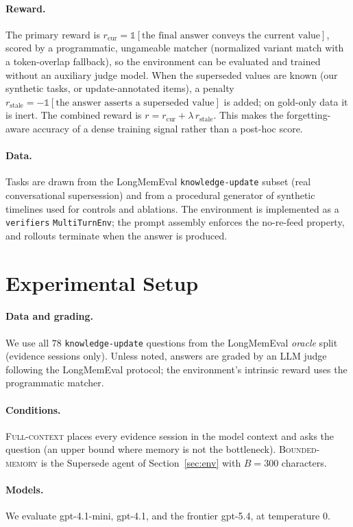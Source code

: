 \documentclass[]{ceurart}
\begin{document}
\paragraph{Reward.} The primary reward is $r_{\text{cur}}=\mathbb{1}[\text{the
final answer conveys the current value}]$, scored by a programmatic,
ungameable matcher (normalized variant match with a token-overlap fallback),
so the environment can be evaluated and trained without an auxiliary judge
model. When the superseded values are known (our synthetic tasks, or
update-annotated items), a penalty
$r_{\text{stale}}=-\mathbb{1}[\text{the answer asserts a superseded value}]$
is added; on gold-only data it is inert. The combined reward is
$r = r_{\text{cur}} + \lambda\, r_{\text{stale}}$. This makes the
forgetting-aware accuracy of \cite{fama2026} a dense training signal rather
than a post-hoc score.

\paragraph{Data.} Tasks are drawn from the LongMemEval
\texttt{knowledge-update} subset (real conversational supersession) and from a
procedural generator of synthetic timelines used for controls and ablations.
The environment is implemented as a \texttt{verifiers} \texttt{MultiTurnEnv};
the prompt assembly enforces the no-re-feed property, and rollouts terminate
when the answer is produced.

\section{Experimental Setup}

\paragraph{Data and grading.} We use all $78$ \texttt{knowledge-update}
questions from the LongMemEval \emph{oracle} split (evidence sessions only).
Unless noted, answers are graded by an LLM judge following the LongMemEval
protocol; the environment's intrinsic reward uses the programmatic matcher.
\paragraph{Conditions.} \textsc{Full-context} places every evidence session in
the model context and asks the question (an upper bound where memory is not the
bottleneck). \textsc{Bounded-memory} is the Supersede agent of
Section~\ref{sec:env} with $B=300$ characters. \paragraph{Models.} We evaluate
gpt-4.1-mini, gpt-4.1, and the frontier gpt-5.4, at temperature $0$.
\end{document}
